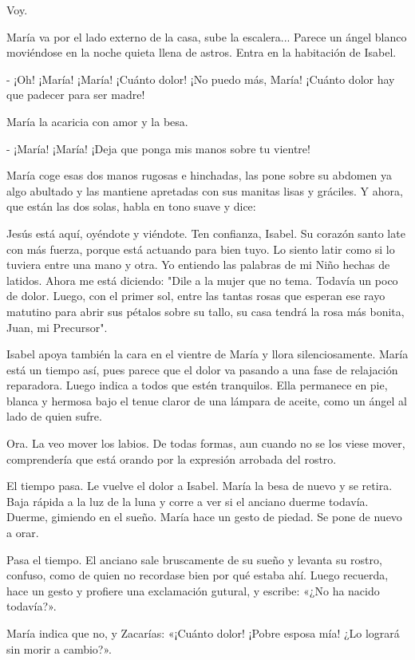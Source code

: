 \documentclass[12pt]{book} %
\begin{document}
Voy. 

María va por el lado externo de la casa, sube la escalera... Parece un ángel blanco moviéndose en la noche quieta llena de astros. Entra en la habitación de Isabel. 

- ¡Oh! ¡María! ¡María! ¡Cuánto dolor! ¡No puedo más, María! ¡Cuánto dolor hay que padecer para ser madre! 

María la acaricia con amor y la besa. 

- ¡María! ¡María! ¡Deja que ponga mis manos sobre tu vientre! 

María coge esas dos manos rugosas e hinchadas, las pone sobre su abdomen ya algo abultado y las mantiene apretadas con sus manitas lisas y gráciles. Y ahora, que están las dos solas, habla en tono suave y dice: 

Jesús está aquí, oyéndote y viéndote. Ten confianza, Isabel. Su corazón santo late con más fuerza, porque está actuando para bien tuyo. Lo siento latir como si lo tuviera entre una mano y otra. Yo entiendo las palabras de mi Niño hechas de latidos. Ahora me está diciendo: "Dile a la mujer que no tema. Todavía un poco de dolor. Luego, con el primer sol, entre las tantas rosas que esperan ese rayo matutino para abrir sus pétalos sobre su tallo, su casa tendrá la rosa más bonita, Juan, mi Precursor". 

Isabel apoya también la cara en el vientre de María y llora silenciosamente. María está un tiempo así, pues parece que el dolor va pasando a una fase de relajación reparadora. Luego indica a todos que estén tranquilos. Ella permanece en pie, blanca y hermosa bajo el tenue claror de una lámpara de aceite, como un ángel al lado de quien sufre. 

Ora. La veo mover los labios. De todas formas, aun cuando no se los viese mover, comprendería que está orando por la expresión arrobada del rostro. 

El tiempo pasa. Le vuelve el dolor a Isabel. María la besa de nuevo y se retira. Baja rápida a la luz de la luna y corre a ver si el anciano duerme todavía. Duerme, gimiendo en el sueño. María hace un gesto de piedad. Se pone de nuevo a orar. 

Pasa el tiempo. El anciano sale bruscamente de su sueño y levanta su rostro, confuso, como de quien no recordase bien por qué estaba ahí. Luego recuerda, hace un gesto y profiere una exclamación gutural, y escribe: «¿No ha nacido todavía?». 

María indica que no, y Zacarías: «¡Cuánto dolor! ¡Pobre esposa mía! ¿Lo logrará sin morir a cambio?». 
\end{document}

